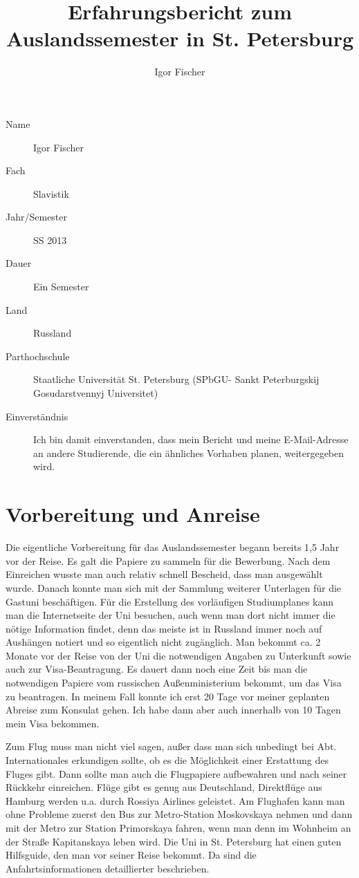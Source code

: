 \documentclass[a4paper]{scrartcl}
\begin{document}
\author{Igor Fischer}
\title{Erfahrungsbericht zum Auslandssemester in St. Petersburg}
\maketitle
\begin{description}

\item[Name] Igor Fischer
\item[Fach] Slavistik
\item[Jahr/Semester] SS 2013
\item[Dauer] Ein Semester
\item[Land] Russland
\item[Parthochschule] Staatliche Universität St. Petersburg (SPbGU- Sankt Peterburgskij Gosudarstvennyj Universitet)
\item[Einverständnis] Ich bin damit einverstanden, dass mein Bericht und meine E-Mail-Adresse an andere Studierende, die ein ähnliches Vorhaben planen, weitergegeben wird.

\end{description}
 

\section*{Vorbereitung und Anreise}
Die eigentliche Vorbereitung für das Auslandssemester begann bereits 1,5 Jahr vor der Reise. Es galt die Papiere  zu sammeln für die Bewerbung. Nach dem Einreichen wusste man auch relativ schnell Bescheid, dass man ausgewählt wurde. Danach konnte man sich mit der Sammlung weiterer Unterlagen für die Gastuni beschäftigen.
Für die Erstellung des vorläufigen Studiumplanes kann man die Internetseite der Uni besuchen, auch wenn man dort nicht immer die nötige Information findet, denn das meiste ist in Russland immer noch auf Aushängen notiert und so eigentlich nicht zugänglich.
Man bekommt ca. 2 Monate vor der Reise von der Uni die notwendigen Angaben zu Unterkunft sowie auch zur Visa-Beantragung. Es dauert dann noch eine Zeit bis man die notwendigen Papiere vom russischen Außenministerium bekommt, um das Visa zu beantragen. In meinem Fall konnte ich erst 20 Tage vor meiner geplanten Abreise zum Konsulat gehen. Ich habe dann aber auch innerhalb von 10 Tagen mein Visa bekommen.

Zum Flug muss man nicht viel sagen, außer dass man sich unbedingt bei Abt. Internationales erkundigen sollte, ob es die Möglichkeit einer Erstattung des Fluges gibt. Dann sollte man auch die Flugpapiere aufbewahren und nach seiner Rückkehr einreichen. Flüge gibt es genug aus Deutschland, Direktflüge aus Hamburg werden u.a. durch Rossiya Airlines geleistet.
Am Flughafen kann man ohne Probleme zuerst den Bus zur Metro-Station Moskovskaya nehmen und dann mit der Metro zur Station Primorskaya fahren, wenn man denn im Wohnheim an der Straße Kapitanskaya leben wird. Die Uni in St. Petersburg hat einen guten Hilfsguide, den man vor seiner Reise bekommt. Da sind die Anfahrtsinformationen detaillierter beschrieben.
\end{document}
